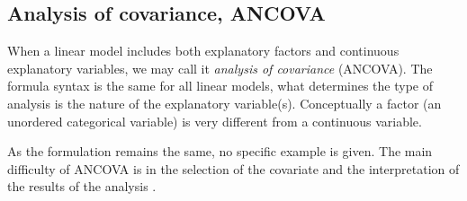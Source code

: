 \documentclass[krantz2]{krantz}\usepackage{knitr}%
\begin{document}
\subsection{Analysis of covariance, ANCOVA}

When a linear model includes both explanatory factors and continuous explanatory variables, we may call it \emph{analysis of covariance} (ANCOVA). The formula syntax is the same for all linear models, what determines the type of analysis is the nature of the explanatory variable(s). Conceptually a factor (an unordered categorical variable) is very different from a continuous variable.

As the formulation remains the same, no specific example is given. The main difficulty of ANCOVA is in the selection of the covariate and the interpretation of the results of the analysis \autocite{}.
\end{document}
